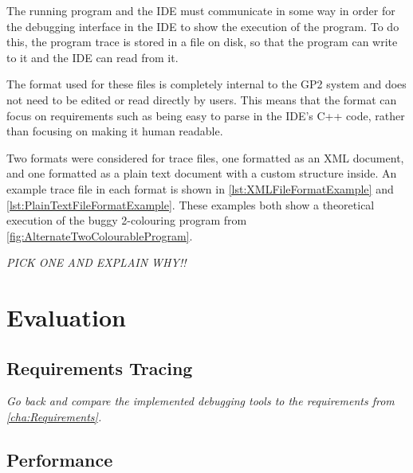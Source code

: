 \documentclass[authoryearcitations]{UoYCSproject}
\newcommand{\includecode}[4][c]{}
\begin{document}
The running program and the IDE must communicate in some way in order for the
debugging interface in the IDE to show the execution of the program. To do this,
the program trace is stored in a file on disk, so that the program can write to
it and the IDE can read from it.

The format used for these files is completely internal to the GP2 system and
does not need to be edited or read directly by users. This means that the format
can focus on requirements such as being easy to parse in the IDE's C++ code,
rather than focusing on making it human readable.

Two formats were considered for trace files, one formatted as an XML document,
and one formatted as a plain text document with a custom structure inside. An
example trace file in each format is shown in \autoref{lst:XMLFileFormatExample}
and \autoref{lst:PlainTextFileFormatExample}. These examples both show a
theoretical execution of the buggy 2-colouring program from
\autoref{fig:AlternateTwoColourableProgram}.

\includecode[xml]{xmltraceexample.xml}{XML based trace file example}{lst:XMLFileFormatExample}

\includecode{plaintraceexample.txt}{Plain text trace file example}{lst:PlainTextFileFormatExample}

\emph{PICK ONE AND EXPLAIN WHY!!}

\clearpage


\chapter{Evaluation}
\label{cha:Evaluation}

\section{Requirements Tracing}
\label{sec:RequirementsTracing}

\emph{Go back and compare the implemented debugging tools to the requirements
from \autoref{cha:Requirements}.}


\section{Performance}
\label{sec:Performance}
\end{document}
